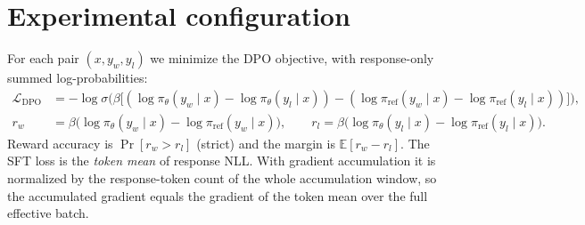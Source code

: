 \documentclass[10pt]{article}
\newcommand{\piw}{\log \pi_\theta(y_w\mid x)}
\newcommand{\pil}{\log \pi_\theta(y_l\mid x)}
\newcommand{\rw}{\log \pi_{\mathrm{ref}}(y_w\mid x)}
\newcommand{\rl}{\log \pi_{\mathrm{ref}}(y_l\mid x)}
\begin{document}
\section{Experimental configuration}
For each pair $(x, y_w, y_l)$ we minimize the DPO objective, with response-only summed log-probabilities:
\begin{align}
\mathcal{L}_{\mathrm{DPO}} &= -\log\sigma\!\Big(\beta\big[(\piw-\pil)-(\rw-\rl)\big]\Big), \label{eq:dpo}\\
r_w &= \beta\big(\piw-\rw\big), \qquad r_l=\beta\big(\pil-\rl\big). \nonumber
\end{align}
Reward accuracy is $\Pr[r_w>r_l]$ (strict) and the margin is $\mathbb{E}[r_w-r_l]$. The SFT loss is the \emph{token mean} of
response NLL. With gradient accumulation it is normalized by the response-token count of the whole accumulation
window, so the accumulated gradient equals the gradient of the token mean over the full effective batch.
\end{document}
